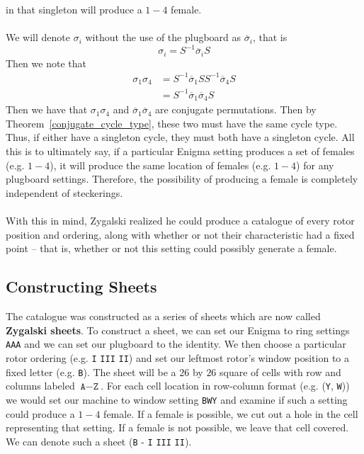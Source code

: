 in that singleton will produce a $1-4$ female.
\\\\We will denote $\sigma_i$ without the use of the plugboard as
$\overline\sigma_i$, that is
\[
  \sigma_i = S^{-1}\overline\sigma_i S
\]
Then we note that
\begin{align*}
  \sigma_1\sigma_4 & = S^{-1}\overline\sigma_1 SS^{-1} \overline\sigma_4 S \\
  & = S^{-1} \overline\sigma_1\overline\sigma_4 S
\end{align*}
Then we have that $\sigma_1\sigma_4$ and
$\overline\sigma_1\overline\sigma_4$ are conjugate permutations. Then
by Theorem~\ref{conjugate_cycle_type}, these two must have the same
cycle type. Thus, if either have a singleton cycle, they must both
have a singleton cycle. All this is to ultimately say, if  a
particular Enigma setting produces a set of females (e.g. $1-4$), it
will produce the same location of females (e.g. $1-4$) for any
plugboard settings. Therefore, the possibility of producing a female is
completely independent of steckerings.
\\\\With this in mind, Zygalski realized he could produce a catalogue
of every rotor position and ordering, along with whether or not their
characteristic had a fixed point -- that is, whether or not this
setting could possibly generate a female.

\subsection{Constructing Sheets}
The catalogue was constructed as a series of sheets which are now
called {\bf{Zygalski sheets}}. To construct a sheet, we can set our
Enigma to ring settings \texttt{AAA} and we can set our plugboard to
the identity. We then choose a particular rotor ordering (e.g.
\texttt{I} \texttt{III} \texttt{II}) and set our leftmost rotor's
window position to a fixed letter (e.g. \texttt{B}). The sheet will
be a $26$ by $26$ square of cells with row and columns labeled
$\texttt{A}-\texttt{Z}$. For each cell location in row-column format
(e.g. (\texttt{Y}, \texttt{W})) we would set our machine to window
setting \texttt{BWY} and examine if such a setting could produce a
$1-4$ female. If a female is possible, we cut out a hole in the cell
representing that setting. If a female is not possible, we leave that
cell covered. We can denote such a sheet (\texttt{B} - \texttt{I}
\texttt{III} \texttt{II}).

